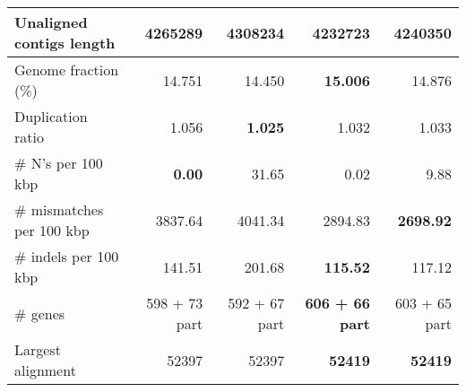 \documentclass[12pt,a4paper]{article}
\begin{document}
\begin{table}[ht]
\begin{center}
\begin{tabular}{|l*{4}{|r}|}
Unaligned contigs length & 4265289 & 4308234 & {\bf 4232723} & 4240350 \\ \hline
Genome fraction (\%) & 14.751 & 14.450 & {\bf 15.006} & 14.876 \\ \hline
Duplication ratio & 1.056 & {\bf 1.025} & 1.032 & 1.033 \\ \hline
\# N's per 100 kbp & {\bf 0.00} & 31.65 & 0.02 & 9.88 \\ \hline
\# mismatches per 100 kbp & 3837.64 & 4041.34 & 2894.83 & {\bf 2698.92} \\ \hline
\# indels per 100 kbp & 141.51 & 201.68 & {\bf 115.52} & 117.12 \\ \hline
\# genes & 598 + 73 part & 592 + 67 part & {\bf 606 + 66 part} & 603 + 65 part \\ \hline
Largest alignment & 52397 & 52397 & {\bf 52419} & {\bf 52419} \\ \hline
\end{tabular}
\end{center}
\end{table}
\end{document}
